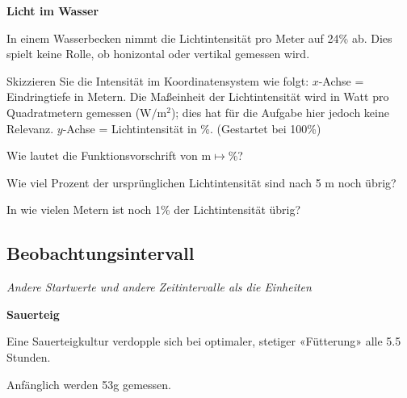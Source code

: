 

\bbwActAufgabenNr{} \textbf{Licht im Wasser}

In einem Wasserbecken nimmt die Lichtintensität pro Meter auf 24\% ab.
Dies spielt keine Rolle, ob honizontal oder vertikal gemessen wird.


\begin{bbwAufgabenBlock}

\item Skizzieren Sie die Intensität im Koordinatensystem wie folgt:
   $x$-Achse = Eindringtiefe in Metern. Die Maßeinheit der
   Lichtintensität wird in Watt pro Quadratmetern gemessen ($\textrm{W}/\textrm{m}^2$); dies
   hat für die Aufgabe hier jedoch keine Relevanz.
   $y$-Achse = Lichtintensität in \%. (Gestartet bei 100\%)
\item Wie lautet die Funktionsvorschrift von $\textrm{m}\mapsto \%$?
\item Wie viel Prozent der ursprünglichen Lichtintensität sind nach 5
   m noch übrig? 

\item In wie vielen Metern ist noch 1\% der Lichtintensität übrig?
\end{bbwAufgabenBlock}
\platzFuerBerechnungenBisEndeSeite{}






\subsection{Beobachtungsintervall}
\textit{Andere Startwerte und andere Zeitintervalle als die Einheiten}



\bbwActAufgabenNr{} \textbf{Sauerteig}

Eine Sauerteigkultur verdopple sich bei optimaler, stetiger «Fütterung» alle 5.5 Stunden.

Anfänglich werden 53g gemessen.

